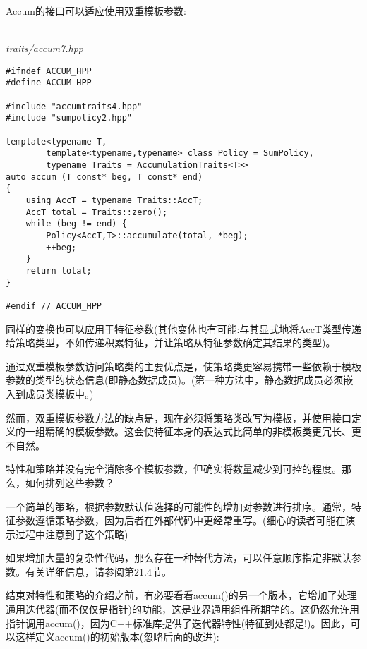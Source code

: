 Accum的接口可以适应使用双重模板参数:

\hspace*{\fill} \\ %
\noindent
\textit{traits/accum7.hpp}
\begin{lstlisting}[style=styleCXX]
#ifndef ACCUM_HPP
#define ACCUM_HPP

#include "accumtraits4.hpp"
#include "sumpolicy2.hpp"

template<typename T,
		template<typename,typename> class Policy = SumPolicy,
		typename Traits = AccumulationTraits<T>>
auto accum (T const* beg, T const* end)
{
	using AccT = typename Traits::AccT;
	AccT total = Traits::zero();
	while (beg != end) {
		Policy<AccT,T>::accumulate(total, *beg);
		++beg;
	}
	return total;
}

#endif // ACCUM_HPP
\end{lstlisting}

同样的变换也可以应用于特征参数(其他变体也有可能:与其显式地将AccT类型传递给策略类型，不如传递积累特征，并让策略从特征参数确定其结果的类型)。

通过双重模板参数访问策略类的主要优点是，使策略类更容易携带一些依赖于模板参数的类型的状态信息(即静态数据成员)。(第一种方法中，静态数据成员必须嵌入到成员类模板中。)

然而，双重模板参数方法的缺点是，现在必须将策略类改写为模板，并使用接口定义的一组精确的模板参数。这会使特征本身的表达式比简单的非模板类更冗长、更不自然。


特性和策略并没有完全消除多个模板参数，但确实将数量减少到可控的程度。那么，如何排列这些参数？

一个简单的策略，根据参数默认值选择的可能性的增加对参数进行排序。通常，特征参数遵循策略参数，因为后者在外部代码中更经常重写。(细心的读者可能在演示过程中注意到了这个策略)

如果增加大量的复杂性代码，那么存在一种替代方法，可以任意顺序指定非默认参数。有关详细信息，请参阅第21.4节。


结束对特性和策略的介绍之前，有必要看看accum()的另一个版本，它增加了处理通用迭代器(而不仅仅是指针)的功能，这是业界通用组件所期望的。这仍然允许用指针调用accum()，因为C++标准库提供了迭代器特性(特征到处都是!)。因此，可以这样定义accum()的初始版本(忽略后面的改进):


